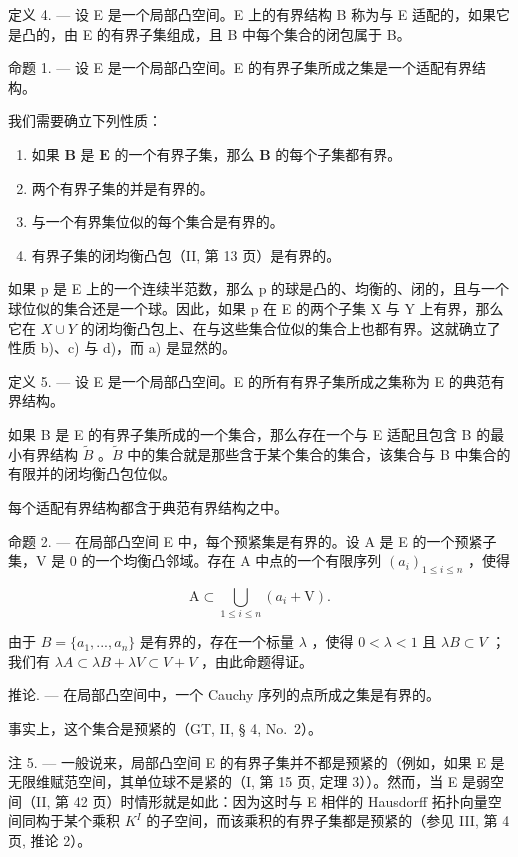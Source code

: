 定义 4. --- 设 E 是一个局部凸空间。E 上的有界结构 B 称为与 E 适配的，如果它是凸的，由 E 的有界子集组成，且 B 中每个集合的闭包属于 B。

命题 1. --- 设 E 是一个局部凸空间。E 的有界子集所成之集是一个适配有界结构。

我们需要确立下列性质：

\begin{enumerate}
\def\labelenumi{\alph{enumi})}
\item
  如果 \(\mathbf{B}\) 是 \(\mathbf{E}\) 的一个有界子集，那么 \(\mathbf{B}\) 的每个子集都有界。
\item
  两个有界子集的并是有界的。
\item
  与一个有界集位似的每个集合是有界的。
\item
  有界子集的闭均衡凸包（II, 第 13 页）是有界的。
\end{enumerate}

如果 p 是 E 上的一个连续半范数，那么 p 的球是凸的、均衡的、闭的，且与一个球位似的集合还是一个球。因此，如果 p 在 E 的两个子集 X 与 Y 上有界，那么它在 \(X \cup Y\) 的闭均衡凸包上、在与这些集合位似的集合上也都有界。这就确立了性质 b)、c) 与 d)，而 a) 是显然的。

定义 5. --- 设 E 是一个局部凸空间。E 的所有有界子集所成之集称为 E 的典范有界结构。

如果 B 是 E 的有界子集所成的一个集合，那么存在一个与 E 适配且包含 B 的最小有界结构 \(\tilde{B}\) 。\(\tilde{B}\) 中的集合就是那些含于某个集合的集合，该集合与 B 中集合的有限并的闭均衡凸包位似。

每个适配有界结构都含于典范有界结构之中。

命题 2. --- 在局部凸空间 E 中，每个预紧集是有界的。设 A 是 E 的一个预紧子集，V 是 0 的一个均衡凸邻域。存在 A 中点的一个有限序列 \((a_{i})_{1\leqslant i\leqslant n}\) ，使得

\[
\mathrm{A} \subset \bigcup_ {1 \leqslant i \leqslant n} (a _ {i} + \mathrm{V}).
\]

由于 \(B = \{a_{1}, ..., a_{n}\}\) 是有界的，存在一个标量 \(\lambda\) ，使得 \(0 < \lambda < 1\) 且 \(\lambda B \subset V\) ；我们有 \(\lambda A \subset \lambda B + \lambda V \subset V + V\) ，由此命题得证。

推论. --- 在局部凸空间中，一个 Cauchy 序列的点所成之集是有界的。

事实上，这个集合是预紧的（GT, II, § 4, No.~2）。

注 5. --- 一般说来，局部凸空间 E 的有界子集并不都是预紧的（例如，如果 E 是无限维赋范空间，其单位球不是紧的（I, 第 15 页, 定理 3））。然而，当 E 是弱空间（II, 第 42 页）时情形就是如此：因为这时与 E 相伴的 Hausdorff 拓扑向量空间同构于某个乘积 \(K^{I}\) 的子空间，而该乘积的有界子集都是预紧的（参见 III, 第 4 页, 推论 2）。

